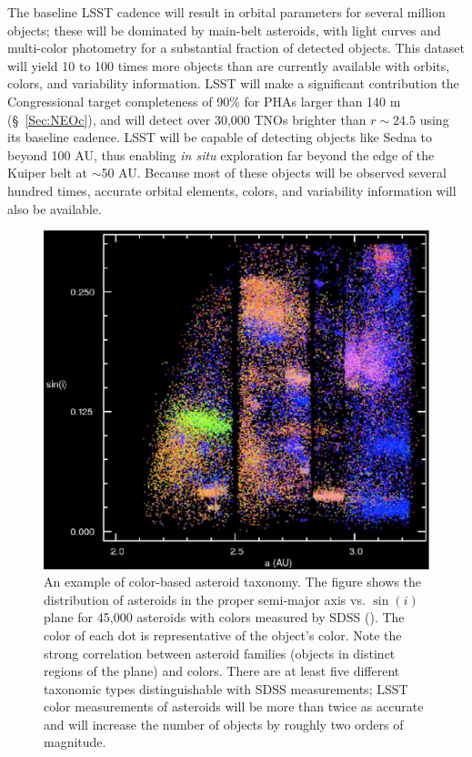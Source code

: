The baseline LSST cadence will result in orbital parameters for several
million objects; these will be dominated by main-belt asteroids, with
light curves and multi-color photometry for a substantial fraction of detected objects.
This dataset will yield 10 to 100 times more objects than are currently
available with orbits, colors, and variability information. LSST will make a significant contribution the Congressional target
completeness of 90\% for PHAs larger than 140 m (\S~\ref{Sec:NEOc}), and will detect over 30,000 TNOs brighter than $r\sim24.5$ using its baseline cadence. LSST will be capable
of detecting objects like Sedna to beyond 100 AU, thus enabling {\it in situ} exploration
far beyond the edge of the Kuiper belt at $\sim$50 AU. Because most of these
objects will be observed several hundred times, accurate orbital elements,
colors, and variability information will also be available.


\begin{figure}
\includegraphics[width=1.0\hsize,clip]{asteroids.pdf}
\caption{An example of color-based asteroid taxonomy. The figure
shows the distribution of asteroids in the proper semi-major axis vs. $\sin(i)$
plane for 45,000 asteroids with colors measured by SDSS (\cite{2008Icar..198..138P}).
The color of each dot is representative of the object's color.
Note the strong correlation between asteroid families (objects in distinct regions
of the plane) and colors. There are
at least five different taxonomic types distinguishable with SDSS measurements;
LSST color measurements of asteroids will be more than twice as accurate
and will increase the number of objects by roughly two orders of magnitude.}
\label{Fig:asteroids}
\end{figure}

